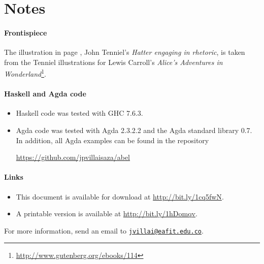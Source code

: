 \section*{Notes}
\label{sec:introduction-notes}

\paragraph{Frontispiece}

The illustration in page \pageref{fig:hatter}, John Tenniel's
\emph{Hatter engaging in rhetoric}, is taken from the Tenniel
illustrations for Lewis Carroll's \emph{Alice's Adventures in
  Wonderland}\footnote{\url{http://www.gutenberg.org/ebooks/114}}.

\paragraph{Haskell and Agda code}

\begin{itemize}
\item
  Haskell code was tested with GHC 7.6.3.

\item
  Agda code was tested with Agda 2.3.2.2 and the Agda standard library
  0.7. In addition, all Agda examples can be found in the repository
  \begin{center}
    \url{https://github.com/jpvillaisaza/abel}
  \end{center}


\end{itemize}

\paragraph{Links}

\begin{itemize}
\item
  This document is available for download at
  \url{http://bit.ly/1cq5fwN}.

\item
  A printable version is available at \url{http://bit.ly/1hDomqv}.

\end{itemize}
For more information, send an email to
\href{mailto:jvillai@eafit.edu.co}{\nolinkurl{jvillai@eafit.edu.co}}.

\clearemptydoublepage
